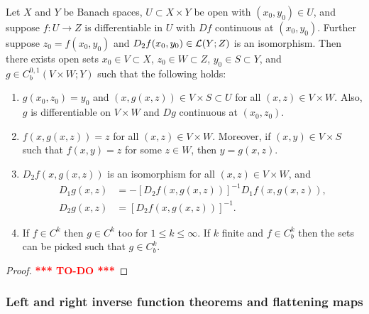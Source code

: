 \documentclass[a4paper]{article}
\newcommand{\TODO}{\textcolor{red}{\textbf{*** TO-DO ***}}}
\begin{document}
\begin{thm}
  Let $X$ and $Y$ be Banach spaces, $U \subset X \times Y$
  be open with $(x_0, y_0) \in U$, and suppose $f: U \to Z$
  is differentiable in $U$ with $Df$ continuous
  at $(x_0, y_0)$. Further suppose $z_0 = f(x_0, y_0)$
  and $D_2 f(x_0, y_0) \in \mathcal{L}(Y; Z)$ is an isomorphism.
  Then there exists open sets $x_0 \in V \subset X$,
  $z_0 \in W \subset Z$, $y_0 \in S \subset Y$, and
  $g \in C^{0,1}_b (V \times W ; Y)$ such that the following
  holds:
  \begin{enumerate}
    \item $g(x_0, z_0) = y_0$ and $(x, g(x, z)) \in V \times S
            \subset U$ for all $(x, z) \in V \times W$. Also, $g$
          is differentiable on $V \times W$ and $Dg$ continuous at
          $(x_0, z_0)$.

    \item $f(x, g(x, z)) = z$ for all $(x, z) \in V \times W$.
          Moreover, if $(x, y) \in V \times S$ such that
          $f(x, y) = z$ for some $z \in W$, then $y = g(x, z)$.

    \item $D_2 f(x, g(x, z))$ is an isomorphism for all
          $(x, z) \in V \times W$, and
          \[
            \begin{aligned}
              D_1 g(x, z) & = - \left[ D_2 f(x, g(x, z)) \right]^{-1}
              D_1 f (x, g(x, z)),                                     \\
              D_2 g(x, z) & = \left[ D_2 f(x, g(x, z)) \right]^{-1}.
            \end{aligned}
          \]

    \item If $f \in C^k$ then $g \in C^k$ too for $1 \leq k \leq \infty$.
          If $k$ finite and $f \in C^k_b$ then the sets can be picked such
          that $g \in C^k_b$.
  \end{enumerate}
\end{thm}

\begin{proof}
  \TODO
\end{proof}

\subsubsection{Left and right inverse function theorems and
  flattening maps}
\end{document}
